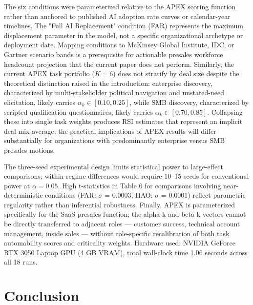 \documentclass[10pt, conference]{IEEEtran}
\begin{document}
The six conditions were parameterized relative to the APEX scoring function rather than anchored to published AI adoption rate curves or calendar-year timelines. The "Full AI Replacement" condition (FAR) represents the maximum displacement parameter in the model, not a specific organizational archetype or deployment date. Mapping conditions to McKinsey Global Institute, IDC, or Gartner scenario bands is a prerequisite for actionable presales workforce headcount projection that the current paper does not perform. Similarly, the current APEX task portfolio ($K = 6$) does not stratify by deal size despite the theoretical distinction raised in the introduction: enterprise discovery, characterized by multi-stakeholder political navigation and unstated-need elicitation, likely carries $\alpha_k \in [0.10, 0.25]$, while SMB discovery, characterized by scripted qualification questionnaires, likely carries $\alpha_k \in [0.70, 0.85]$. Collapsing these into single task weights produces RSI estimates that represent an implicit deal-mix average; the practical implications of APEX results will differ substantially for organizations with predominantly enterprise versus SMB presales motions.

The three-seed experimental design limits statistical power to large-effect comparisons; within-regime differences would require 10--15 seeds for conventional power at $\alpha = 0.05$. High t-statistics in Table 6 for comparisons involving near-deterministic conditions (FAR: $\sigma$ = 0.0003, HAO: $\sigma$ = 0.0001) reflect parametric regularity rather than inferential robustness. Finally, APEX is parameterized specifically for the SaaS presales function; the alpha-k and beta-k vectors cannot be directly transferred to adjacent roles --- customer success, technical account management, inside sales --- without role-specific recalibration of both task automability scores and criticality weights. Hardware used: NVIDIA GeForce RTX 3050 Laptop GPU (4 GB VRAM), total wall-clock time 1.06 seconds across all 18 runs.

\section{Conclusion}

\label{sec:conclusion}
\end{document}
